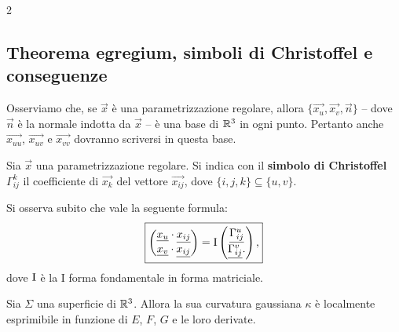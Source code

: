\begin{multicols*}{2}
    \subsection{Theorema egregium, simboli di Christoffel e conseguenze}

    \begin{remark}
        Osserviamo che, se $\vec{x}$ è una parametrizzazione regolare,
        allora $\{\vec{x_u}, \vec{x_v}, \vec{n}\}$ -- dove $\vec{n}$ è la
        normale indotta da $\vec{x}$ -- è una base di $\mathbb{R}^3$ in ogni punto.
        Pertanto anche $\vec{x_{uu}}$, $\vec{x_{uv}}$ e $\vec{x_{vv}}$ dovranno
        scriversi in questa base.
    \end{remark}

    \begin{definition}
        Sia $\vec{x}$ una parametrizzazione regolare. Si indica con
        il \textbf{simbolo di Christoffel} $\Gamma_{ij}^k$ il coefficiente di $\vec{x_k}$
        del vettore $\vec{x_{ij}}$, dove
        $\{i, j, k\} \subseteq \{u, v\}$.
    \end{definition}

    \begin{remark}
        Si osserva subito che vale la seguente formula:
        \[
            \boxed{\begin{pmatrix}
                    {\underline{x_u}} \cdot {\underline{x_{ij}}} \\
                    {\underline{x_v}} \cdot {\underline{x_{ij}}}
                \end{pmatrix} =
                \mathrm{I} \begin{pmatrix}
                    {\underline{\Gamma_{ij}^u}} \\
                    {\underline{\Gamma_{ij}^v}}.
                \end{pmatrix},}
        \]
        dove $\mathrm{I}$ è la I forma fondamentale in forma matriciale.
    \end{remark}

    \begin{theorem}
        Sia $\Sigma$ una superficie di $\mathbb{R}^3$. Allora la sua
        curvatura gaussiana $\kappa$ è localmente esprimibile in funzione
        di $E$, $F$, $G$ e le loro derivate.
    \end{theorem}


\end{multicols*}
